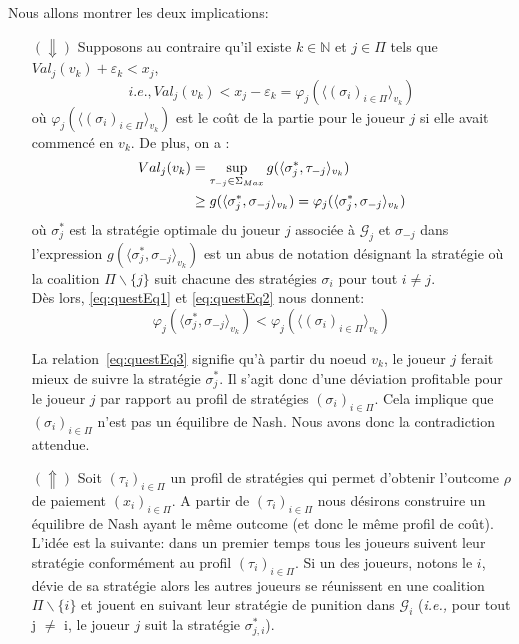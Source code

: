 \begin{demonstration}
	Nous allons montrer les deux implications:\\
	\begin{itemize}
		\item[$(\Downarrow)$] Supposons au contraire qu'il existe $k\in \mathbb{N}$ et $j\in\Pi$ tels que $Val_j(v_k) + \varepsilon_k < x_j$,
		\begin{equation}
			\label{eq:questEq1}
			i.e., Val_j(v_k) < x_j - \varepsilon_k = \varphi_j(\langle (\sigma_i)_{i \in \Pi}\rangle_{v_k})
		\end{equation}
		où $\varphi_j(\langle (\sigma_i)_{i \in \Pi}\rangle_{v_k})$ est le coût de la partie pour le joueur $j$ si elle avait commencé en $v_k$.
		De plus, on a : 
		\begin{align}
			\label{eq:questEq2}
			Val_j(v_k) &= \sup_{\tau_{-j}\in \Sigma_{Max}} g(\langle \sigma^*_j,\tau_{-j} \rangle_{v_k}) \notag\\
			           &\geq g (\langle \sigma^*_j,\sigma_{-j} \rangle_{v_k}) = \varphi_j(\langle \sigma^*_j,\sigma_{-j} \rangle_{v_k})
		\end{align}
		où $\sigma^*_j$ est la stratégie optimale du joueur $j$ associée à $\mathcal{G}_j$ et $\sigma_{-j}$ dans l'expression $g (\langle \sigma^*_j,\sigma_{-j} \rangle_{v_k})$ est un abus de notation désignant la stratégie où la coalition $\Pi\backslash\{ j \}$ suit chacune des stratégies $\sigma_i$ pour tout $i \neq j$.\\
		
		Dès lors, \eqref{eq:questEq1} et \eqref{eq:questEq2} nous donnent:
		\begin{equation}
			\label{eq:questEq3}
			\varphi_j(\langle \sigma^*_j,\sigma_{-j} \rangle_{v_k}) < \varphi_j(\langle(\sigma_i)_{i\in \Pi}\rangle_{v_k})
		\end{equation}
		
		La relation~\eqref{eq:questEq3} signifie qu'à partir du noeud $v_k$, le joueur $j$ ferait mieux de suivre la stratégie $\sigma^*_j$. Il s'agit donc d'une déviation profitable pour le joueur $j$ par rapport au profil de stratégies $(\sigma_i)_{i\in \Pi}$. Cela implique que $(\sigma_i)_{i\in\Pi}$ n'est pas un équilibre de Nash. Nous avons donc la contradiction attendue.\\
		
		\item[$(\Uparrow)$] Soit $(\tau_i)_{i\in \Pi}$ un profil de stratégies qui permet d'obtenir l'outcome $\rho$ de paiement $(x_i)_{i\in\Pi}$.
		A partir de $(\tau_i)_{i\in \Pi}$ nous désirons construire un équilibre de Nash ayant le même outcome (et donc le même profil de coût).
		L'idée est la suivante: dans un premier temps tous les joueurs suivent leur stratégie conformément au profil $(\tau_i)_{i \in \Pi}$. Si un des joueurs, notons le $i$,  dévie de sa stratégie alors les autres joueurs se réunissent en une coalition $\Pi\backslash \{ i \}$ et jouent en suivant leur stratégie de punition dans $\mathcal{G}_i$ (\emph{i.e.,} pour tout j $\neq$ i, le joueur $j$ suit la stratégie $\sigma^*_{j,i}$).\\
		

\end{itemize}
\end{demonstration}
